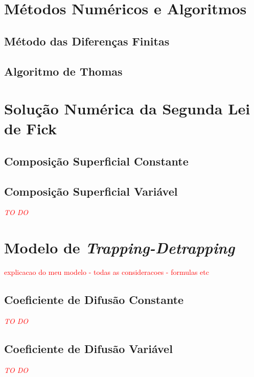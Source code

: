 \documentclass[]{politex}
\newcommand\myworries[1]{\textcolor{red}{#1}}
\begin{document}
\section{Métodos Numéricos e Algoritmos}

\subsection{Método das Diferenças Finitas}
\label{sec:dif-fin}


\subsection{Algoritmo de Thomas}	
\label{sec:algo-thomas}


\section{Solução Numérica da Segunda Lei de Fick}
\subsection{Composição Superficial Constante}
\label{sec:sol-numerica-2alei}


\subsection{Composição Superficial Variável}
\label{sec:sol-numerica-2alei2}
\myworries{\textit{TO DO}}

\section{Modelo de \textit{Trapping-Detrapping}}
\label{sec:my-trapdetrap}
\myworries{explicacao do meu modelo - todas as consideracoes - formulas etc}


\subsection{Coeficiente de Difusão Constante}
\label{sec:my-trapdetrap-cte}

\myworries{\textit{TO DO}}

\subsection{Coeficiente de Difusão Variável}
\label{sec:my-trapdetrap-full}
\myworries{\textit{TO DO}}
\end{document}
